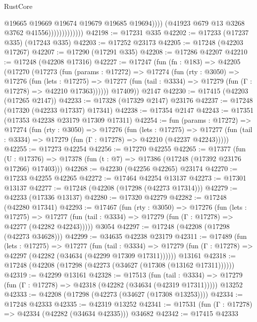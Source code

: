 \begin{lexlean}{RustCore}
\begin{coremodule}
                                    @19665
                                    @19669
                                    @19674
                                    @19679
                                    @19685
                                    @19694))))
                            (@41923 @679 @13 @3268 @3762 @41556)))))))))))))
@42198 := @17231 @335
@42202 := @17233 (@17237 @335) (@17243 @335)
@42203 := @17252 @23173
@42205 := @17248 (@42203 @17267)
@42207 := @17290 (@17291 @335)
@42208 := @17286 @42207
@42210 := @17248 (@42208 @17316)
@42227 := @17247
    (fun (fn : @183) =>
    @42205
      (@17270
        (@17273
          (fun (params : @17272) =>
          @17274
            (fun (rty : @3050) =>
            @17276
              (fun (lets : @17275) =>
              @17277 (fun (tail : @3334) => @17279 (fun (Γ : @17278) => @42210 @17363))))))
        @17409))
    @2147
@42230 := @17415 (@42203 (@17265 @2147))
@42233 := @17328 (@17329 @2147) @23176
@42237 := @17248 (@17320 (@42233 @17337) @17341)
@42238 := @17354 @2147
@42243 := @17351 (@17353 @42238 @23179 @17309 @17311)
@42254 := fun (params : @17272) =>
  @17274
    (fun (rty : @3050) =>
    @17276
      (fun (lets : @17275) =>
      @17277 (fun (tail : @3334) => @17279 (fun (Γ : @17278) => @42210 (@42237 @42243)))))
@42255 := @17273 @42254
@42256 := @17270 @42255
@42265 := @17377
    (fun (U : @17376) => @17378 (fun (t : @7) => @17386 (@17248 (@17392 @23176 @17266) @17403)))
@42268 := @42230 (@42256 @42265) @23174
@42270 := @17233 @42255 @42265
@42272 := @17464 @42254 @13137
@42273 := @17301 @13137
@42277 := @17248 (@42208 (@17298 (@42273 @17314)))
@42279 := @42233 (@17336 @13137)
@42280 := @17320 @42279
@42282 := @17248 (@42280 @17341)
@42293 := @17467
    (fun (rty : @3050) =>
    @17276
      (fun (lets : @17275) =>
      @17277 (fun (tail : @3334) => @17279 (fun (Γ : @17278) => @42277 (@42282 @42243)))))
    @3054
@42297 := @17248 (@42208 (@17298 (@42273 @34628)))
@42299 := @34635 @42238 @23179
@42311 := @17489
    (fun (lets : @17275) =>
    @17277
      (fun (tail : @3334) =>
      @17279 (fun (Γ : @17278) => @42297 (@42282 (@34634 (@42299 @17309 @17311))))))
    @13161
@42318 := @17248 (@42208 (@17298 (@42273 (@34627 (@17308 (@13162 @17311))))))
@42319 := @42299 @13161
@42328 := @17513
    (fun (tail : @3334) => @17279 (fun (Γ : @17278) => @42318 (@42282 (@34634 (@42319 @17311)))))
    @13252
@42333 := @42208 (@17298 (@42273 (@34627 (@17308 @13253))))
@42334 := @17248 @42333
@42335 := @42319 @13252
@42341 := @17531 (fun (Γ : @17278) => @42334 (@42282 (@34634 @42335))) @34682
@42342 := @17415 @42333

\end{coremodule}
\end{lexlean}
